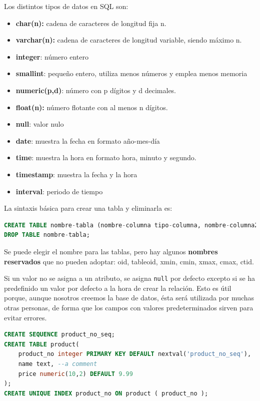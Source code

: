 Los distintos tipos de datos en SQL son:
\begin{itemize}
\item \textbf{char(n):} cadena de caracteres de longitud fija n.
\item \textbf{varchar(n):} cadena de caracteres de longitud variable, siendo máximo n.
\item \textbf{integer}: número entero
\item \textbf{smallint}: pequeño entero, utiliza menos números y emplea menos memoria
\item \textbf{numeric(p,d)}: número con p dígitos y d decimales.
\item \textbf{float(n):} número flotante con al menos n dígitos.
\item \textbf{null}: valor nulo
\item \textbf{date}: muestra la fecha en formato año-mes-día
\item \textbf{time}: muestra la hora en formato hora, minuto y segundo.
\item \textbf{timestamp}: muestra la fecha y la hora
\item \textbf{interval}: periodo de tiempo
\end{itemize}

La sintaxis básica para crear una tabla y eliminarla es:
\begin{lstlisting}[language=SQL]
CREATE TABLE nombre-tabla (nombre-columna tipo-columna, nombre-columna2 tipo-columna2);
DROP TABLE nombre-tabla;
\end{lstlisting}

Se puede elegir el nombre para las tablas, pero hay algunos \textbf{nombres reservados} que no pueden adoptar: oid, tableoid, xmin, cmin, xmax, cmax, ctid.

Si un valor no se asigna a un atributo, se asigna \texttt{null} por defecto excepto si se ha predefinido un valor por defecto a la hora de crear la relación. Esto es útil porque, aunque nosotros creemos la base de datos, ésta será utilizada por muchas otras personas, de forma que los campos con valores predeterminados sirven para evitar errores.
\begin{lstlisting}[language=SQL]
CREATE SEQUENCE product_no_seq; 
CREATE TABLE product(
	product_no integer PRIMARY KEY DEFAULT nextval('product_no_seq'),
	name text, --a comment
	price numeric(10,2) DEFAULT 9.99
);
CREATE UNIQUE INDEX product_no ON product ( product_no );
\end{lstlisting}

